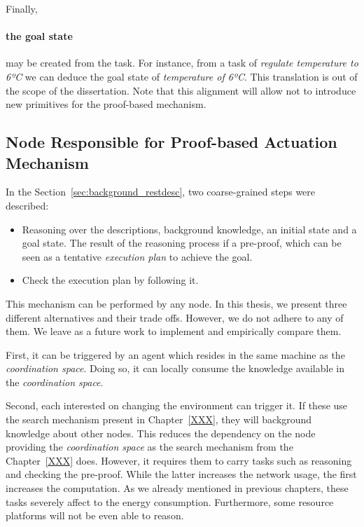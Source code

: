Finally, \paragraph{the goal state} may be created from the task.
For instance, from a task of \emph{regulate temperature to 6ºC} we can deduce the goal state of \emph{temperature of 6ºC}.
This translation is out of the scope of the dissertation.
Note that this alignment will allow not to introduce new primitives for the proof-based mechanism.



\subsection{Node Responsible for Proof-based Actuation Mechanism}

In the Section~\ref{sec:background_restdesc}, two coarse-grained steps were described:
\begin{itemize}
  \item Reasoning over the descriptions, background knowledge, an initial state and a goal state.
        The result of the reasoning process if a pre-proof, which can be seen as a tentative \emph{execution plan} to achieve the goal.
  \item Check the execution plan by following it.
\end{itemize}


This mechanism can be performed by any node.
In this thesis, we present three different alternatives and their trade offs.
However, we do not adhere to any of them.
We leave as a future work to implement and empirically compare them.


First, it can be triggered by an agent which resides in the same machine as the \emph{coordination space}.
Doing so, it can locally consume the knowledge available in the \emph{coordination space}.


Second, each \consumer{} interested on changing the environment can trigger it.
If these \consumers{} use the search mechanism present in Chapter~\ref{XXX}, they will background knowledge about other nodes.
This reduces the dependency on the node providing the \emph{coordination space} as the search mechanism from the Chapter~\ref{XXX} does.
However, it requires them to carry tasks such as reasoning and checking the pre-proof.
While the latter increases the network usage, the first increases the computation.
As we already mentioned in previous chapters, these tasks severely affect to the energy consumption.
Furthermore, some resource platforms will not be even able to reason.



